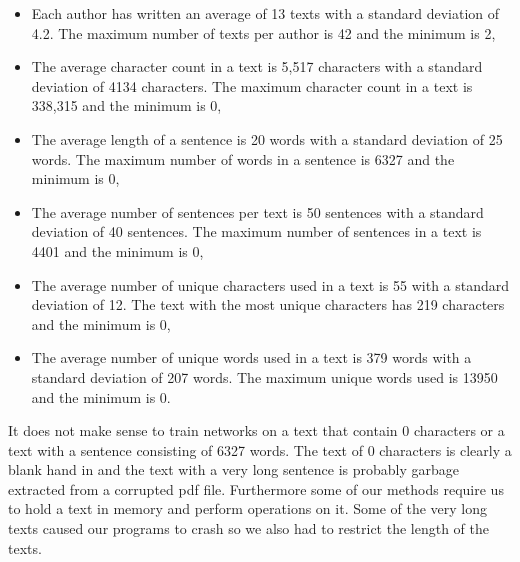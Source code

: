 \begin{itemize}

    \item

        Each author has written an average of 13 texts with a standard deviation
        of 4.2. The maximum number of texts per author is 42 and the minimum is
        2,

    \item

        The average character count in a text is 5,517 characters with a
        standard deviation of 4134 characters. The maximum character count in a
        text is 338,315 and the minimum is 0,

    \item

        The average length of a sentence is 20 words with a standard deviation
        of 25 words. The maximum number of words in a sentence is 6327 and the
        minimum is 0,

    \item

        The average number of sentences per text is 50 sentences with a standard
        deviation of 40 sentences. The maximum number of sentences in a text is
        4401 and the minimum is 0,

    \item

        The average number of unique characters used in a text is 55 with a
        standard deviation of 12. The text with the most unique characters has
        219 characters and the minimum is 0,

    \item

        The average number of unique words used in a text is 379 words with a
        standard deviation of 207 words. The maximum unique words used is 13950
        and the minimum is 0.

\end{itemize}

It does not make sense to train networks on a text that contain 0 characters
or a text with a sentence consisting of 6327 words. The text of 0 characters
is clearly a blank hand in and the text with a very long sentence is probably
garbage extracted from a corrupted pdf file. Furthermore some of our methods
require us to hold a text in memory and perform operations on it. Some of the
very long texts caused our programs to crash so we also had to restrict the
length of the texts.

